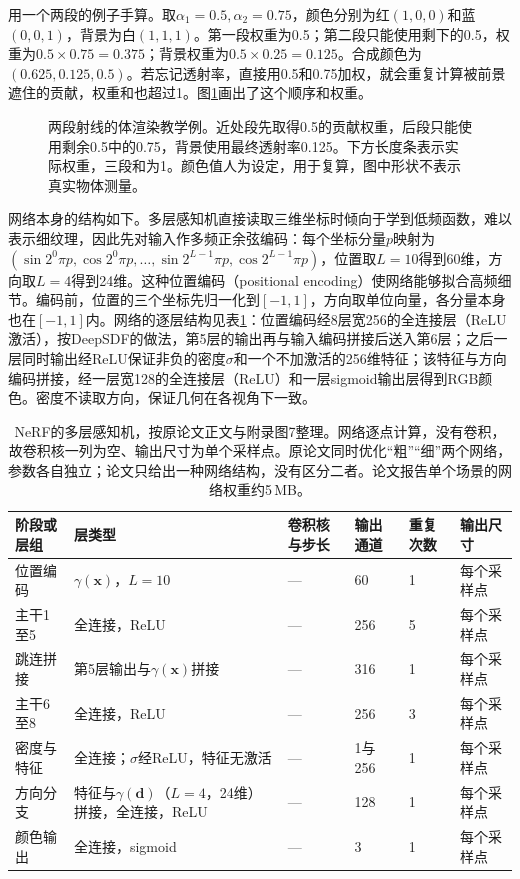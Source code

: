 用一个两段的例子手算。取$\alpha_1=0.5,\alpha_2=0.75$，颜色分别为红$(1,0,0)$和蓝$(0,0,1)$，背景为白$(1,1,1)$。第一段权重为0.5；第二段只能使用剩下的0.5，权重为$0.5\times0.75=0.375$；背景权重为$0.5\times0.25=0.125$。合成颜色为$(0.625,0.125,0.5)$。若忘记透射率，直接用0.5和0.75加权，就会重复计算被前景遮住的贡献，权重和也超过1。图\ref{fig:vision-ray-compositing}画出了这个顺序和权重。

\begin{figure}[htbp]
 \centering
 
 \caption{两段射线的体渲染教学例。近处段先取得0.5的贡献权重，后段只能使用剩余0.5中的0.75，背景使用最终透射率0.125。下方长度条表示实际权重，三段和为1。颜色值人为设定，用于复算，图中形状不表示真实物体测量。}
 \label{fig:vision-ray-compositing}
\end{figure}

网络本身的结构如下。多层感知机直接读取三维坐标时倾向于学到低频函数，难以表示细纹理，因此先对输入作多频正余弦编码：每个坐标分量$p$映射为$(\sin2^0\pi p,\cos2^0\pi p,\ldots,\sin2^{L-1}\pi p,\cos2^{L-1}\pi p)$，位置取$L=10$得到60维，方向取$L=4$得到24维。这种位置编码（positional encoding）使网络能够拟合高频细节。编码前，位置的三个坐标先归一化到$[-1,1]$，方向取单位向量，各分量本身也在$[-1,1]$内。网络的逐层结构见表\ref{tab:vision-nerf-structure}：位置编码经8层宽256的全连接层（ReLU激活），按DeepSDF的做法，第5层的输出再与输入编码拼接后送入第6层；之后一层同时输出经ReLU保证非负的密度$\sigma$和一个不加激活的256维特征；该特征与方向编码拼接，经一层宽128的全连接层（ReLU）和一层sigmoid输出层得到RGB颜色。密度不读取方向，保证几何在各视角下一致。

\begin{table}[htbp]
 \centering
 \small
 \begin{tabularx}{\linewidth}{@{}p{16mm}Xp{15mm}p{9mm}p{6mm}p{15mm}@{}}
  \toprule
  阶段或层组 & 层类型 & 卷积核与步长 & 输出通道 & 重复次数 & 输出尺寸\\
  \midrule
  位置编码 & $\gamma(\bm{x})$，$L=10$ & — & 60 & 1 & 每个采样点\\
  主干1至5 & 全连接，ReLU & — & 256 & 5 & 每个采样点\\
  跳连拼接 & 第5层输出与$\gamma(\bm{x})$拼接 & — & 316 & 1 & 每个采样点\\
  主干6至8 & 全连接，ReLU & — & 256 & 3 & 每个采样点\\
  密度与特征 & 全连接；$\sigma$经ReLU，特征无激活 & — & 1与256 & 1 & 每个采样点\\
  方向分支 & 特征与$\gamma(\bm{d})$（$L=4$，24维）拼接，全连接，ReLU & — & 128 & 1 & 每个采样点\\
  颜色输出 & 全连接，sigmoid & — & 3 & 1 & 每个采样点\\
  \bottomrule
 \end{tabularx}
 \caption{NeRF的多层感知机，按原论文正文与附录图7整理。网络逐点计算，没有卷积，故卷积核一列为空、输出尺寸为单个采样点。原论文同时优化“粗”“细”两个网络，参数各自独立；论文只给出一种网络结构，没有区分二者。论文报告单个场景的网络权重约5\,MB。}
 \label{tab:vision-nerf-structure}
\end{table}


